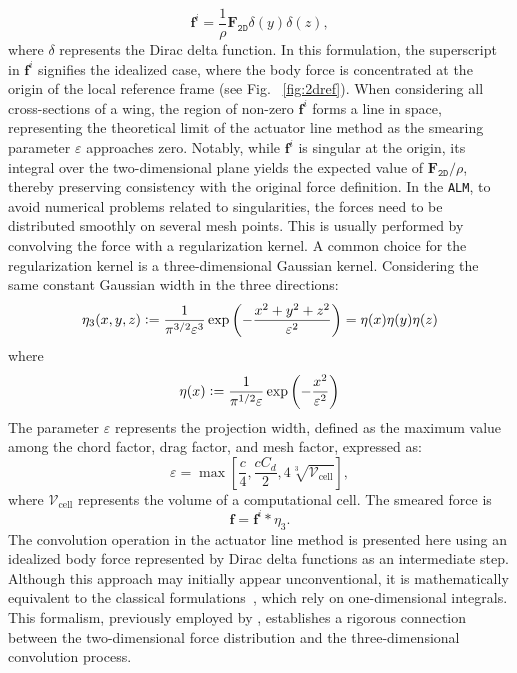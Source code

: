 \documentclass[11pt,a4paper]{article}
\newcommand{\defeq}{\vcentcolon=}
\begin{document}
%
\begin{equation}
\label{eq:f2d}
\boldsymbol{f}^i = \frac{1}{\rho} \boldsymbol{\text{F}}_{\texttt{2D}} \delta(y) \delta(z),
\end{equation}
%
where $\delta$ represents the Dirac delta function. In this formulation, the superscript in $\boldsymbol{f}^i$ signifies the idealized case, where the body force is concentrated at the origin of the local reference frame (see Fig. ~\ref{fig:2dref}). 
%
When considering all cross-sections of a wing, the region of non-zero $\boldsymbol{f}^i$ forms a line in space, representing the theoretical limit of the actuator line method as the smearing parameter $\varepsilon$ approaches zero. Notably, while $\boldsymbol{f}^i$ is singular at the origin, its integral over the two-dimensional plane yields the expected value of $\boldsymbol{\text{F}}_{\texttt{2D}}/\rho$, thereby preserving consistency with the original force definition.
%
In the \texttt{ALM}, to avoid numerical problems related to singularities, the forces need to be distributed smoothly on several mesh points. This is usually performed by convolving the force with a regularization kernel. A common choice for the regularization kernel is a three-dimensional Gaussian kernel.  Considering the same constant Gaussian width in the three directions:
\begin{equation}
\label{eq:eta3d}
\eta_3(x,y,z) \defeq \frac{1}{\pi^{3/2}\varepsilon^3} \exp{\left(-\frac{x^2+y^2+z^2}{\varepsilon^2}\right)}=\eta(x)\eta(y)\eta(z)
\end{equation}
where
\begin{equation}
\eta(x) \defeq \frac{1}{\pi^{1/2}\varepsilon} \exp{\left(-\frac{x^2}{\varepsilon^2}\right)}
\end{equation}
The parameter $\varepsilon$ represents the projection width, defined as the maximum value among the chord factor, drag factor, and mesh factor, expressed as:
\[
\varepsilon = \max \left[\frac{c}{4}, \frac{c C_{d}}{2}, 4 \sqrt[3]{\mathcal{V}_{\text{cell}}}\right],
\]
where $\mathcal{V}_{\text{cell}}$ represents the volume of a computational cell. The smeared force is
\begin{equation}
\boldsymbol{f} = \boldsymbol{f}^i * \eta_3 .
\label{eq:fconvoluted}
\end{equation}
%
The convolution operation in the actuator line method is presented here using an idealized body force represented by Dirac delta functions as an intermediate step. Although this approach may initially appear unconventional, it is mathematically equivalent to the classical formulations~\citep{sorensen2002numerical, mikkelsen2003actuator}, which rely on one-dimensional integrals. This formalism, previously employed by \cite{martinez2019filtered}, establishes a rigorous connection between the two-dimensional force distribution and the three-dimensional convolution process.
\end{document}
